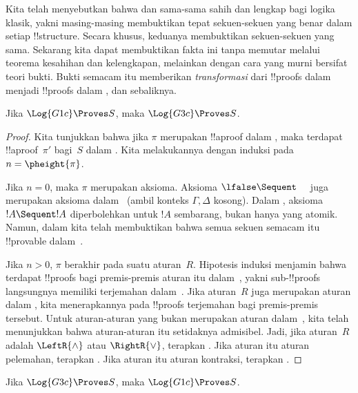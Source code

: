 \documentclass[../../../include/open-logic-section]{subfiles}
\begin{document}


Kita telah menyebutkan bahwa  dan  sama-sama sahih dan
lengkap bagi logika klasik, yakni masing-masing membuktikan tepat sekuen-sekuen
yang benar dalam setiap !!{structure}. Secara khusus, keduanya membuktikan
sekuen-sekuen yang sama. Sekarang kita dapat membuktikan fakta ini tanpa
memutar melalui teorema kesahihan dan kelengkapan, melainkan dengan cara yang
murni bersifat teori bukti. Bukti semacam itu memberikan
\emph{transformasi} dari !!{proof}s dalam  menjadi !!{proof}s dalam
, dan sebaliknya.

\begin{prop}
Jika $\Log{G1c} \Proves S$, maka $\Log{G3c} \Proves S$.
\end{prop}

\begin{proof}
  Kita tunjukkan bahwa jika $\pi$ merupakan !!a{proof} dalam , maka
  terdapat !!a{proof}~$\pi'$ bagi~$S$ dalam . Kita melakukannya
  dengan induksi pada $n = \pheight{\pi}$.

  Jika $n = 0$, maka $\pi$ merupakan aksioma. Aksioma $\lfalse \Sequent
  \quad$ juga merupakan aksioma dalam~ (ambil konteks $\Gamma,
  \Delta$ kosong). Dalam , aksioma $!A \Sequent !A$ diperbolehkan
  untuk $!A$ sembarang, bukan hanya yang atomik. Namun, dalam
   kita telah membuktikan bahwa semua sekuen
  semacam itu !!{provable} dalam~.
  
  Jika $n>0$, $\pi$ berakhir pada suatu aturan~$R$. Hipotesis induksi menjamin
  bahwa terdapat !!{proof}s bagi premis-premis aturan itu dalam~,
  yakni sub-!!{proof}s langsungnya memiliki terjemahan dalam~. Jika
  aturan~$R$ juga merupakan aturan dalam , kita menerapkannya pada
  !!{proof}s terjemahan bagi premis-premis tersebut. Untuk aturan-aturan yang
  bukan merupakan aturan dalam~, kita telah menunjukkan bahwa
  aturan-aturan itu setidaknya admisibel. Jadi, jika aturan~$R$ adalah
  $\LeftR{\land}$ atau $\RightR{\lor}$, terapkan
  . Jika aturan itu aturan pelemahan, terapkan
  . Jika aturan itu aturan kontraksi, terapkan
  .
\end{proof}

\begin{prop}
Jika $\Log{G3c} \Proves S$, maka $\Log{G1c} \Proves S$.
\end{prop}
\end{document}

